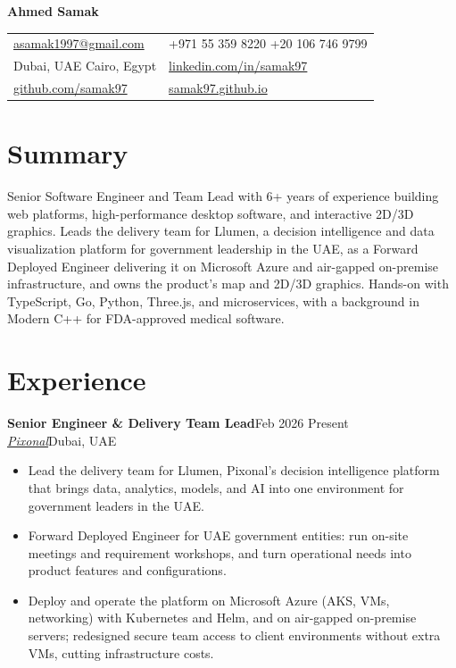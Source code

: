 \documentclass[10pt,a4paper]{article}
\newcommand{\job}[4]{%
  \vspace{4pt}\textbf{#1}\hfill #4\\
  \textit{#2}\hfill #3\par\vspace{1pt}}
\newcommand{\contact}[2]{\makebox[1.4em][l]{#1}#2}
\begin{document}
{\fontsize{24}{28}\selectfont\bfseries Ahmed Samak}\hspace{0.6em}{\Large\itshape Senior Software Engineer \& Team Lead}\par
\vspace{6pt}
{\small
\begin{tabularx}{\linewidth}{@{}X X@{}}
  \contact{\faEnvelope}{\href{mailto:asamak1997@gmail.com}{asamak1997@gmail.com}} & \contact{\faPhone}{+971 55 359 8220 \quad +20 106 746 9799} \\[2pt]
  \contact{\faMapMarker*}{Dubai, UAE \textendash{} Cairo, Egypt} & \contact{\faLinkedin}{\href{https://www.linkedin.com/in/samak97}{linkedin.com/in/samak97}} \\[2pt]
  \contact{\faGithub}{\href{https://github.com/samak97}{github.com/samak97}} & \contact{\faLink}{\href{https://samak97.github.io}{samak97.github.io}} \\
\end{tabularx}}

\section{Summary}
Senior Software Engineer and Team Lead with 6+ years of experience building web platforms, high-performance
desktop software, and interactive 2D/3D graphics. Leads the delivery team for Llumen, a decision intelligence and
data visualization platform for government leadership in the UAE, as a Forward Deployed Engineer delivering it on
Microsoft Azure and air-gapped on-premise infrastructure, and owns the product's map and 2D/3D graphics. \mbox{Hands-on} with
TypeScript, Go, Python, Three.js, and microservices, with a background in Modern C++ for FDA-approved medical software.

\section{Experience}

\job{Senior Engineer \& Delivery Team Lead}{\href{https://www.pixonal.com/}{Pixonal}}{Dubai, UAE}{Feb 2026 \textendash{} Present}
\begin{itemize}
  \item Lead the delivery team for Llumen, Pixonal's decision intelligence platform that brings data, analytics, models,
        and AI into one environment for government leaders in the UAE.
  \item Forward Deployed Engineer for UAE government entities: run on-site meetings and requirement workshops, and turn
        operational needs into product features and configurations.
  \item Deploy and operate the platform on Microsoft Azure (AKS, VMs, networking) with Kubernetes and Helm, and on
        air-gapped on-premise servers; redesigned secure team access to client environments without extra VMs, cutting infrastructure costs.
\end{itemize}
\end{document}
